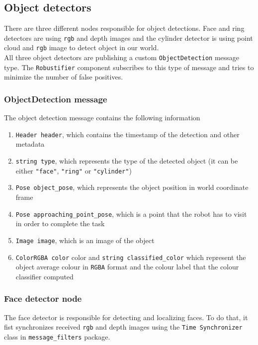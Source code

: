 \documentclass[12pt,a4paper]{article}
\begin{document}
	\subsection{Object detectors}
	There are three different nodes responsible for object detections. Face and ring detectors are using \texttt{rgb} and depth images and the cylinder detector is using point cloud and \texttt{rgb} image to detect object in our world. \\
	
	All three object detectors are publishing a custom \texttt{ObjectDetection} message type. The \texttt{Robustifier} component subscribes to this type of message and tries to minimize the number of false positives. 
	
	\subsubsection{ObjectDetection message}
	The object detection message contains the following information
	\begin{enumerate}
		\item \texttt{Header header}, which contains the timestamp of the detection and other metadata
		\item \texttt{string type}, which represents the type of the detected object (it can be either \texttt{"face"}, \texttt{"ring"} or \texttt{"cylinder"})
		\item \texttt{Pose object\_pose}, which represents the object position in world coordinate frame
		\item \texttt{Pose approaching\_point\_pose}, which is a point that the robot has to visit in order to complete the task
		\item \texttt{Image image}, which is an image of the object
		\item \texttt{ColorRGBA color} color and \texttt{string classified\_color} which represent the object average colour in \texttt{RGBA} format and the colour label that the colour classifier computed
	\end{enumerate}

	
	\subsubsection{Face detector node}
	The face detector is responsible for detecting and localizing faces. To do that, it fist synchronizes received \texttt{rgb} and depth images using the \texttt{Time Synchronizer} class in \texttt{message\_filters} package. \\
\end{document}
